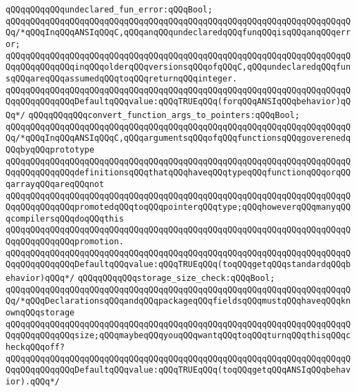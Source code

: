 \newline
\verb|qQQqqQQqqQQqundeclared_fun_error:qQQqBool;|\newline
\verb|qQQqqQQqqQQqqQQqqQQqqQQqqQQqqQQqqQQqqQQqqQQqqQQqqQQqqQQqqQQqqQQqqQQqqQQq/*qQQqInqQQqANSIqQQqC,qQQqanqQQqundeclaredqQQqfunqQQqisqQQqanqQQqerror;|\newline
\verb|qQQqqQQqqQQqqQQqqQQqqQQqqQQqqQQqqQQqqQQqqQQqqQQqqQQqqQQqqQQqqQQqqQQqqQQqqQQqqQQqqQQqinqQQqolderqQQqversionsqQQqofqQQqC,qQQqundeclaredqQQqfunsqQQqareqQQqassumedqQQqtoqQQqreturnqQQqinteger.|\newline
\verb|qQQqqQQqqQQqqQQqqQQqqQQqqQQqqQQqqQQqqQQqqQQqqQQqqQQqqQQqqQQqqQQqqQQqqQQqqQQqqQQqqQQqDefaultqQQqvalue:qQQqTRUEqQQq(forqQQqANSIqQQqbehavior)qQQq*/|\newline
\newline
\verb|qQQqqQQqqQQqconvert_function_args_to_pointers:qQQqBool;|\newline
\verb|qQQqqQQqqQQqqQQqqQQqqQQqqQQqqQQqqQQqqQQqqQQqqQQqqQQqqQQqqQQqqQQqqQQqqQQq/*qQQqInqQQqANSIqQQqC,qQQqargumentsqQQqofqQQqfunctionsqQQqgoverenedqQQqbyqQQqprototype|\newline
\verb|qQQqqQQqqQQqqQQqqQQqqQQqqQQqqQQqqQQqqQQqqQQqqQQqqQQqqQQqqQQqqQQqqQQqqQQqqQQqqQQqqQQqdefinitionsqQQqthatqQQqhaveqQQqtypeqQQqfunctionqQQqorqQQqarrayqQQqareqQQqnot|\newline
\verb|qQQqqQQqqQQqqQQqqQQqqQQqqQQqqQQqqQQqqQQqqQQqqQQqqQQqqQQqqQQqqQQqqQQqqQQqqQQqqQQqqQQqpromotedqQQqtoqQQqpointerqQQqtype;qQQqhoweverqQQqmanyqQQqcompilersqQQqdoqQQqthis|\newline
\verb|qQQqqQQqqQQqqQQqqQQqqQQqqQQqqQQqqQQqqQQqqQQqqQQqqQQqqQQqqQQqqQQqqQQqqQQqqQQqqQQqqQQqpromotion.|\newline
\verb|qQQqqQQqqQQqqQQqqQQqqQQqqQQqqQQqqQQqqQQqqQQqqQQqqQQqqQQqqQQqqQQqqQQqqQQqqQQqqQQqqQQqDefaultqQQqvalue:qQQqTRUEqQQq(toqQQqgetqQQqstandardqQQqbehavior)qQQq*/|\newline
\newline
\verb|qQQqqQQqqQQqstorage_size_check:qQQqBool;|\newline
\verb|qQQqqQQqqQQqqQQqqQQqqQQqqQQqqQQqqQQqqQQqqQQqqQQqqQQqqQQqqQQqqQQqqQQqqQQq/*qQQqDeclarationsqQQqandqQQqpackageqQQqfieldsqQQqmustqQQqhaveqQQqknownqQQqstorage|\newline
\verb|qQQqqQQqqQQqqQQqqQQqqQQqqQQqqQQqqQQqqQQqqQQqqQQqqQQqqQQqqQQqqQQqqQQqqQQqqQQqqQQqqQQqsize;qQQqmaybeqQQqyouqQQqwantqQQqtoqQQqturnqQQqthisqQQqcheckqQQqoff?|\newline
\verb|qQQqqQQqqQQqqQQqqQQqqQQqqQQqqQQqqQQqqQQqqQQqqQQqqQQqqQQqqQQqqQQqqQQqqQQqqQQqqQQqqQQqDefaultqQQqvalue:qQQqTRUEqQQq(toqQQqgetqQQqANSIqQQqbehavior).qQQq*/|\newline
